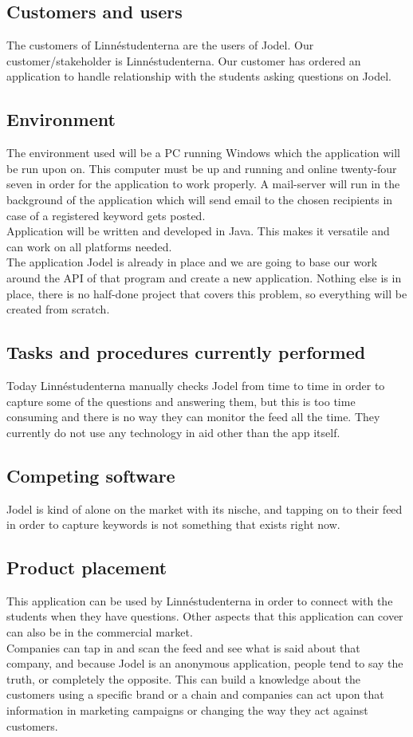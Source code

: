\documentclass[a4paper,12pt]{article}
\begin{document}
\subsection{Customers and users}
The customers of Linnéstudenterna are the users of Jodel. Our customer/stakeholder is Linnéstudenterna. Our customer has ordered an application to handle relationship with the students asking questions on Jodel.
\subsection{Environment}
The environment used will be a PC running Windows which the application will be run upon on. This computer must be up and running and online twenty-four seven in order for the application to work properly. A mail-server will run in the background of the application which will send email to the chosen recipients in case of a registered keyword gets posted.\\
Application will be written and developed in Java. This makes it versatile and can work on all platforms needed.
\\The application Jodel is already in place and we are going to base our work around the API of that program and create a new application. Nothing else is in place, there is no half-done project that covers this problem, so everything will be created from scratch.
\subsection{Tasks and procedures currently performed}
Today Linnéstudenterna manually checks Jodel from time to time in order to capture some of the questions and answering them, but this is too time consuming and there is no way they can monitor the feed all the time. They currently do not use any technology in aid other than the app itself.
\subsection{Competing software}
Jodel is kind of alone on the market with its nische, and tapping on to their feed in order to capture keywords is not something that exists right now.
\subsection{Product placement}
This application can be used by Linnéstudenterna in order to connect with the students when they have questions. Other aspects that this application can cover can also be in the commercial market. \\
Companies can tap in and scan the feed and see what is said about that company, and because Jodel is an anonymous application, people tend to say the truth, or completely the opposite. This can build a knowledge about the customers using a specific brand or a chain and companies can act upon that information in marketing campaigns or changing the way they act against customers.
\end{document}
